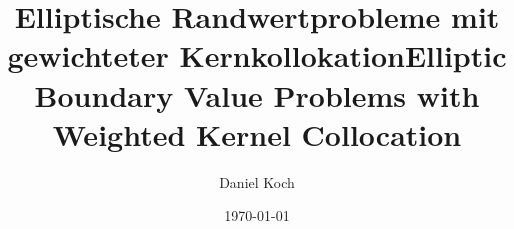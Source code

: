 \documentclass[%
  bachelor,%
  final,%
  english,%
  ngerman,%
  male,%
]{iswstud}
\author{Daniel Koch}
\date{\today}
\title{Elliptische Randwertprobleme mit gewichteter Kernkollokation}
\theoremstyle{plain}
\theoremstyle{definition}
\theoremstyle{definition}
\theoremstyle{remark}
\begin{document}
\frontmatter
\coverpage

\maketitle



\begin{otherlanguage}{english}
  \title{Elliptic Boundary Value Problems with Weighted Kernel Collocation}
  \shorttitle{}
  \subtitle{}

  \maketitle
\end{otherlanguage}



\begin{abstract}
  
\end{abstract}



\begin{otherlanguage}{english}
  \begin{abstract}

       
  \end{abstract}
\end{otherlanguage}
\end{document}
